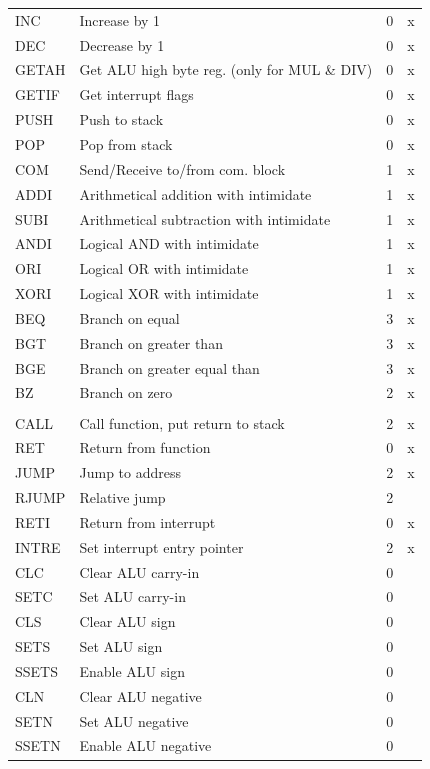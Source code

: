 \documentclass[a4paper,12pt]{article}
\begin{document}
\begin{longtable}[h!]{| l | p{} | c | c |}
	INC  & Increase by 1 & 0 & x \\
	DEC  & Decrease by 1 & 0 & x \\
	GETAH& Get ALU high byte reg. (only for MUL \& DIV) & 0 & x \\
	GETIF& Get interrupt flags & 0 & x \\\hline
		
	PUSH & Push to stack & 0 & x \\
	POP  & Pop from stack & 0 & x \\
	COM  & Send/Receive to/from com. block & 1 & x \\\hline
	
	ADDI & Arithmetical addition with intimidate & 1 & x \\
	SUBI & Arithmetical subtraction with intimidate & 1 & x \\
	ANDI & Logical AND with intimidate & 1 & x \\
	ORI  & Logical OR with intimidate & 1 & x \\
	XORI & Logical XOR with intimidate & 1 & x \\\hline
	
	BEQ  & Branch on equal & 3 & x \\
	BGT  & Branch on greater than & 3 & x \\
	BGE  & Branch on greater equal than & 3 & x \\
	BZ   & Branch on zero & 2 & x \\
		
	\arrayrulecolor{black}\hline
	\multicolumn{4}{|c|}{
		\cellcolor[rgb]{0.7,0.7,1}\textit{0 register instructions}
	} \\
	\hline\arrayrulecolor[rgb]{0.82,0.82,0.82} 
		
	CALL & Call function, put return to stack & 2 & x \\
	RET  & Return from function & 0 & x \\
	JUMP & Jump to address & 2 & x \\
	RJUMP& Relative jump & 2 & \\\hline
	RETI & Return from interrupt & 0 & x \\
	INTRE& Set interrupt entry pointer & 2 & x \\\hline
	
	CLC  & Clear ALU carry-in & 0 & \\
	SETC & Set ALU carry-in & 0 & \\
	CLS  & Clear ALU sign & 0 & \\
	SETS & Set ALU sign & 0 & \\
	SSETS& Enable ALU sign & 0 & \\
	CLN  & Clear ALU negative & 0 & \\
	SETN & Set ALU negative & 0 & \\
	SSETN& Enable ALU negative & 0 & \\

\end{longtable}	
\end{document}
